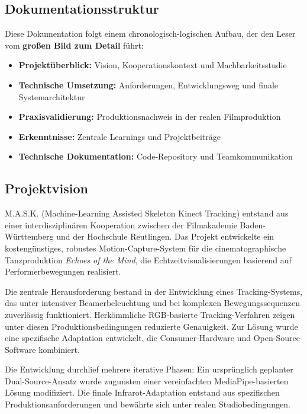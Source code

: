 \subsection*{Dokumentationsstruktur}

Diese Dokumentation folgt einem chronologisch-logischen Aufbau, der den Leser vom \textbf{großen Bild zum Detail} führt:

\begin{itemize}
    \item \textbf{Projektüberblick:} Vision, Kooperationskontext und Machbarkeitsstudie
    \item \textbf{Technische Umsetzung:} Anforderungen, Entwicklungsweg und finale Systemarchitektur  
    \item \textbf{Praxisvalidierung:} Produktionsnachweis in der realen Filmproduktion
    \item \textbf{Erkenntnisse:} Zentrale Learnings und Projektbeiträge
    \item \textbf{Technische Dokumentation:} Code-Repository und Teamkommunikation
\end{itemize}

\subsection*{Projektvision}

M.A.S.K. (Machine-Learning Assisted Skeleton Kinect Tracking) entstand aus einer interdisziplinären Kooperation zwischen der Filmakademie Baden-Württemberg und der Hochschule Reutlingen. Das Projekt entwickelte ein kostengünstiges, robustes Motion-Capture-System für die cinematographische Tanzproduktion \textit{Echoes of the Mind}, die Echtzeitvisualisierungen basierend auf Performerbewegungen realisiert.

Die zentrale Herausforderung bestand in der Entwicklung eines Tracking-Systems, das unter intensiver Beamerbeleuchtung und bei komplexen Bewegungssequenzen zuverlässig funktioniert. Herkömmliche RGB-basierte Tracking-Verfahren zeigen unter diesen Produktionsbedingungen reduzierte Genauigkeit. Zur Lösung wurde eine spezifische Adaptation entwickelt, die Consumer-Hardware und Open-Source-Software kombiniert.

Die Entwicklung durchlief mehrere iterative Phasen: Ein ursprünglich geplanter Dual-Source-Ansatz wurde zugunsten einer vereinfachten MediaPipe-basierten Lösung modifiziert. Die finale Infrarot-Adaptation entstand aus spezifischen Produktionsanforderungen und bewährte sich unter realen Studiobedingungen.

